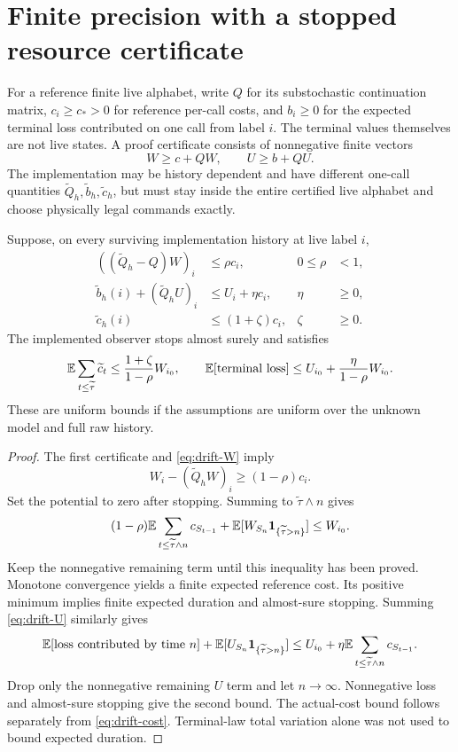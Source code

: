 \section{Finite precision with a stopped resource certificate}
\label{sec:numerics}
For a reference finite live alphabet, write $Q$ for its substochastic continuation matrix, $c_i\ge c_*>0$ for reference per-call costs, and $b_i\ge0$ for the expected terminal loss contributed on one call from label $i$. The terminal values themselves are not live states. A proof certificate consists of nonnegative finite vectors
\begin{equation}\label{eq:potentials}
 W\ge c+QW,\qquad U\ge b+QU.
\end{equation}
The implementation may be history dependent and have different one-call quantities $\widetilde Q_h,\widetilde b_h,\widetilde c_h$, but must stay inside the entire certified live alphabet and choose physically legal commands exactly.

\begin{theorem}\label{thm:perturbation}
Suppose, on every surviving implementation history at live label $i$,
\begin{align}
 ((\widetilde Q_h-Q)W)_i&\le\rho c_i,&0\le\rho&<1,\label{eq:drift-W}\\
 \widetilde b_h(i)+(\widetilde Q_hU)_i&\le U_i+\eta c_i,&\eta&\ge0,\label{eq:drift-U}\\
 \widetilde c_h(i)&\le(1+\zeta)c_i,&\zeta&\ge0.\label{eq:drift-cost}
\end{align}
The implemented observer stops almost surely and satisfies
\begin{equation}\label{eq:implementation}
 \mathbb E\sum_{t\le\widetilde\tau}\widetilde c_t
   \le\frac{1+\zeta}{1-\rho}W_{i_0},\qquad
 \mathbb E[\text{terminal loss}]
   \le U_{i_0}+\frac{\eta}{1-\rho}W_{i_0}.
\end{equation}
These are uniform bounds if the assumptions are uniform over the unknown model and full raw history.
\end{theorem}
\begin{proof}
The first certificate and \eqref{eq:drift-W} imply
\[
 W_i-(\widetilde Q_hW)_i\ge(1-\rho)c_i.
\]
Set the potential to zero after stopping. Summing to $\widetilde\tau\wedge n$ gives
\[
 (1-\rho)\mathbb E\sum_{t\le\widetilde\tau\wedge n}c_{S_{t-1}}
 +\mathbb E[W_{S_n}\mathbf1_{\{\widetilde\tau>n\}}]\le W_{i_0}.
\]
Keep the nonnegative remaining term until this inequality has been proved. Monotone convergence yields a finite expected reference cost. Its positive minimum implies finite expected duration and almost-sure stopping. Summing \eqref{eq:drift-U} similarly gives
\[
 \mathbb E[\text{loss contributed by time }n]
 +\mathbb E[U_{S_n}\mathbf1_{\{\widetilde\tau>n\}}]
 \le U_{i_0}+\eta\mathbb E\sum_{t\le\widetilde\tau\wedge n}c_{S_{t-1}}.
\]
Drop only the nonnegative remaining $U$ term and let $n\to\infty$. Nonnegative loss and almost-sure stopping give the second bound. The actual-cost bound follows separately from \eqref{eq:drift-cost}. Terminal-law total variation alone was not used to bound expected duration.
\end{proof}

